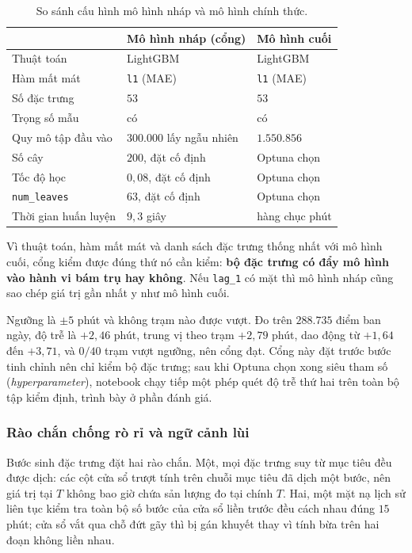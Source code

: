 \documentclass[12pt, a4paper]{report}
\begin{document}
\begin{table}[htbp]
\centering
\caption{So sánh cấu hình mô hình nháp và mô hình chính thức.}
\label{tab:mo_hinh_nhap}
\small
\begin{tabular}{@{}L{4.6cm} L{4.9cm} L{4.6cm}@{}}
\toprule
 & \textbf{Mô hình nháp (cổng)} & \textbf{Mô hình cuối} \\
\midrule
Thuật toán & LightGBM & LightGBM \\
Hàm mất mát & \texttt{l1} (MAE) & \texttt{l1} (MAE) \\
Số đặc trưng & $53$ & $53$ \\
Trọng số mẫu & có & có \\
\addlinespace
Quy mô tập đầu vào & $300.000$ lấy ngẫu nhiên & $1.550.856$ \\
Số cây & $200$, đặt cố định & Optuna chọn \\
Tốc độ học & $0{,}08$, đặt cố định & Optuna chọn \\
\texttt{num\_leaves} & $63$, đặt cố định & Optuna chọn \\
Thời gian huấn luyện & $9{,}3$ giây & hàng chục phút \\
\bottomrule
\end{tabular}
\end{table}

Vì thuật toán, hàm mất mát và danh sách đặc trưng thống nhất với mô hình cuối, cổng kiểm được đúng
thứ nó cần kiểm: \textbf{bộ đặc trưng có đẩy mô hình vào hành vi bám trụ hay không}. Nếu
\texttt{lag\_1} có mặt thì mô hình nháp cũng sao chép giá trị gần nhất y như mô hình cuối.

Ngưỡng là $\pm 5$ phút và không trạm nào được vượt. Đo trên $288.735$ điểm ban ngày, độ
trễ là $+2{,}46$ phút, trung vị theo trạm $+2{,}79$ phút, dao động từ $+1{,}64$ đến
$+3{,}71$, và $0/40$ trạm vượt ngưỡng, nên cổng đạt. Cổng này đặt trước bước tinh chỉnh
nên chỉ kiểm bộ đặc trưng; sau khi Optuna chọn xong siêu tham số (\textit{hyperparameter}), notebook chạy tiếp một
phép quét độ trễ thứ hai trên toàn bộ tập kiểm định, trình bày ở phần đánh giá.

\subsubsection{Rào chắn chống rò rỉ và ngữ cảnh lùi}

Bước sinh đặc trưng đặt hai rào chắn. Một, mọi đặc trưng suy từ mục tiêu đều được dịch:
các cột cửa sổ trượt tính trên chuỗi mục tiêu đã dịch một bước, nên giá trị tại $T$ không
bao giờ chứa sản lượng đo tại chính $T$. Hai, một mặt nạ lịch sử liên tục kiểm tra toàn
bộ số bước của cửa sổ liền trước đều cách nhau đúng $15$ phút; cửa sổ vắt qua chỗ đứt gãy
thì bị gán khuyết thay vì tính bừa trên hai đoạn không liền nhau.
\end{document}
